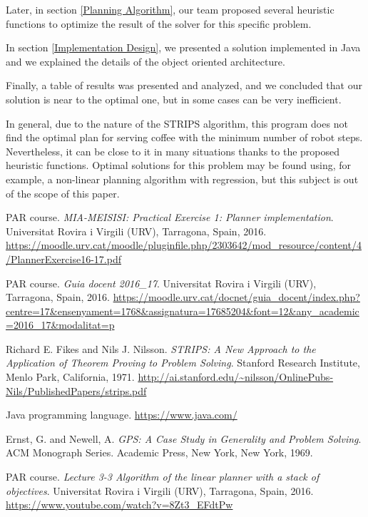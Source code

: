 \documentclass[12pt,a4paper,oneside]{article}
\numberwithin{equation}{section}
\numberwithin{equation}{section}
\theoremstyle{definition}
\begin{document}
Later, in section \ref{Planning Algorithm}, our team proposed several heuristic functions to optimize the result of the solver for this specific problem.


In section \ref{Implementation Design},  we presented a solution implemented in Java and we explained the details of the object oriented architecture.

Finally, a table of results was presented and analyzed, and we concluded that our solution is near to the optimal one, but in some cases can be very inefficient.


In general, due to the nature of the STRIPS algorithm, this program does not find the optimal plan for serving coffee with the minimum number of robot steps. Nevertheless, it can be close to it in many situations thanks to the proposed heuristic functions. Optimal solutions for this problem may be found using, for example, a non-linear planning algorithm with regression, but this subject is out of the scope of this paper.


\newpage


\begin{thebibliography}{25}
	
	
	 PAR course. \textsl{MIA-MEISISI: Practical Exercise 1: Planner implementation}. Universitat Rovira i Virgili (URV), Tarragona, Spain, 2016. \url{https://moodle.urv.cat/moodle/pluginfile.php/2303642/mod_resource/content/4/PlannerExercise16-17.pdf}
	
	
	 PAR course. \textsl{Guia docent 2016\_17}. Universitat Rovira i Virgili (URV), Tarragona, Spain, 2016. \url{https://moodle.urv.cat/docnet/guia_docent/index.php?centre=17&ensenyament=1768&assignatura=17685204&font=12&any_academic=2016_17&modalitat=p}
	
	
	 Richard E. Fikes and Nils J. Nilsson. \textsl{STRIPS: A New Approach to the
		Application of Theorem Proving to Problem Solving}. Stanford Research Institute, Menlo Park, California, 1971. \url{http://ai.stanford.edu/~nilsson/OnlinePubs-Nils/PublishedPapers/strips.pdf}
	
	
	 Java programming language. \url{https://www.java.com/}
	
	
	 Ernst, G. and Newell, A. \textsl{GPS: A Case Study in Generality and Problem Solving}. ACM Monograph Series. Academic Press, New York, New York, 1969.
	
	
	 PAR course. \textsl{Lecture 3-3 Algorithm of the linear planner with a stack of objectives}. Universitat Rovira i Virgili (URV), Tarragona, Spain, 2016. \url{https://www.youtube.com/watch?v=8Zt3_EFdtPw}
	
\end{thebibliography}
\end{document}
